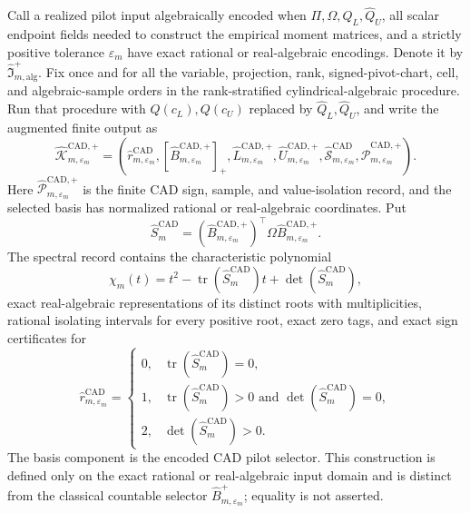 Call a realized pilot input algebraically encoded when \(\Pi,\Omega,\widehat Q_L,\widehat Q_U\), all scalar endpoint fields needed to construct the empirical moment matrices, and a strictly positive tolerance \(\varepsilon_m\) have exact rational or real-algebraic encodings.  Denote it by \(\widehat{\mathfrak I}_{m,\mathrm{alg}}^+\).  Fix once and for all the variable, projection, rank, signed-pivot-chart, cell, and algebraic-sample orders in the rank-stratified cylindrical-algebraic procedure.  Run that procedure with \(Q(c_L),Q(c_U)\) replaced by \(\widehat Q_L,\widehat Q_U\), and write the augmented finite output as
\[
\widehat{\mathscr K}_{m,\varepsilon_m}^{\mathrm{CAD},+}
=\left(
\widehat r_{m,\varepsilon_m}^{\mathrm{CAD}},
[\widehat B_{m,\varepsilon_m}^{\mathrm{CAD},+}]_+,
\widehat L_{m,\varepsilon_m}^{\mathrm{CAD},+},
\widehat U_{m,\varepsilon_m}^{\mathrm{CAD},+},
\widehat{\mathscr S}_{m,\varepsilon_m}^{\mathrm{CAD}},
\widehat{\mathscr P}_{m,\varepsilon_m}^{\mathrm{CAD},+}
\right).
\]
Here \(\widehat{\mathscr P}_{m,\varepsilon_m}^{\mathrm{CAD},+}\) is the finite CAD sign, sample, and value-isolation record, and the selected basis has normalized rational or real-algebraic coordinates.  Put
\[
\widehat S_m^{\mathrm{CAD}}
=(\widehat B_{m,\varepsilon_m}^{\mathrm{CAD},+})^{\top}
\Omega\widehat B_{m,\varepsilon_m}^{\mathrm{CAD},+}.
\]
The spectral record contains the characteristic polynomial
\[
\chi_m(t)=t^2-\operatorname{tr}(\widehat S_m^{\mathrm{CAD}})t
+\det(\widehat S_m^{\mathrm{CAD}}),
\]
exact real-algebraic representations of its distinct roots with multiplicities, rational isolating intervals for every positive root, exact zero tags, and exact sign certificates for
\[
\widehat r_{m,\varepsilon_m}^{\mathrm{CAD}}=
\begin{cases}
0,&\operatorname{tr}(\widehat S_m^{\mathrm{CAD}})=0,\\
1,&\operatorname{tr}(\widehat S_m^{\mathrm{CAD}})>0
\text{ and }\det(\widehat S_m^{\mathrm{CAD}})=0,\\
2,&\det(\widehat S_m^{\mathrm{CAD}})>0.
\end{cases}
\]
The basis component is the encoded CAD pilot selector.  This construction is defined only on the exact rational or real-algebraic input domain and is distinct from the classical countable selector \(\widehat B_{m,\varepsilon_m}^+\); equality is not asserted.


